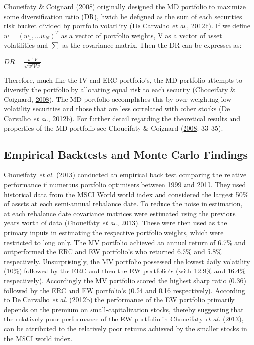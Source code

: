 \documentclass[11pt,preprint, authoryear]{elsarticle}
\numberwithin{equation}{section}
\numberwithin{figure}{section}
\numberwithin{table}{section}
\begin{document}
Choueifaty \& Coignard (\protect\hyperlink{ref-choueifaty2008}{2008})
originally designed the MD portfolio to maximize some diversification
ratio (DR), hwich he defigned as the sum of each securities risk bucket
divided by portfolio volatility (De Carvalho \emph{et al.},
\protect\hyperlink{ref-leote}{2012}\protect\hyperlink{ref-leote}{b}). If
we define \(w=(w_1,...w_N)^T\) as a vector of portfolio weights, V as a
vector of asset volatilities and \(\sum\) as the covariance matrix. Then
the DR can be expresses as:

\begin{center} 
$DR= \frac{w'.V}{\sqrt{w'Vw}}$ 
\end{center}

Therefore, much like the IV and ERC portfolio's, the MD portfolio
attempts to diversify the portfolio by allocating equal risk to each
security (Choueifaty \& Coignard,
\protect\hyperlink{ref-choueifaty2008}{2008}). The MD portfolio
accomplishes this by over-weighting low volatility securities and those
that are less correlated with other stocks (De Carvalho \emph{et al.},
\protect\hyperlink{ref-leote}{2012}\protect\hyperlink{ref-leote}{b}).
For further detail regarding the theoretical results and properties of
the MD portfolio see Choueifaty \& Coignard
(\protect\hyperlink{ref-choueifaty2008}{2008}: 33--35).

\hypertarget{empirical-backtests-and-monte-carlo-findings}{%
\subsection{Empirical Backtests and Monte Carlo
Findings}\label{empirical-backtests-and-monte-carlo-findings}}

Choueifaty \emph{et al.} (\protect\hyperlink{ref-choueifaty2013}{2013})
conducted an empirical back test comparing the relative performance if
numerous portfolio optimisers between 1999 and 2010. They used
historical data from the MSCI World world index and considered the
largest 50\% of assets at each semi-annual rebalance date. To reduce the
noise in estimation, at each rebalance date covariance matrices were
estimated using the previous years worth of data (Choueifaty \emph{et
al.}, \protect\hyperlink{ref-choueifaty2013}{2013}). These were then
used as the primary inputs in estimating the respective portfolio
weights, which were restricted to long only. The MV portfolio achieved
an annual return of 6.7\% and outperformed the ERC and EW portfolio's
who returned 6.3\% and 5.8\% respectively. Unsurprisingly, the MV
portfolio possessed the lowest daily volatility (10\%) followed by the
ERC and then the EW portfolio's (with 12.9\% and 16.4\% respectively).
Accordingly the MV portfolio scored the highest sharp ratio (0.36)
followed by the ERC and EW portfolio's (0.24 and 0.16 respectively).
According to De Carvalho \emph{et al.}
(\protect\hyperlink{ref-leote}{2012}\protect\hyperlink{ref-leote}{b})
the performance of the EW portfolio primarily depends on the premium on
small-capitalization stocks, thereby suggesting that the relatively poor
performance of the EW portfolio in Choueifaty \emph{et al.}
(\protect\hyperlink{ref-choueifaty2013}{2013}), can be attributed to the
relatively poor returns achieved by the smaller stocks in the MSCI world
index.
\end{document}
